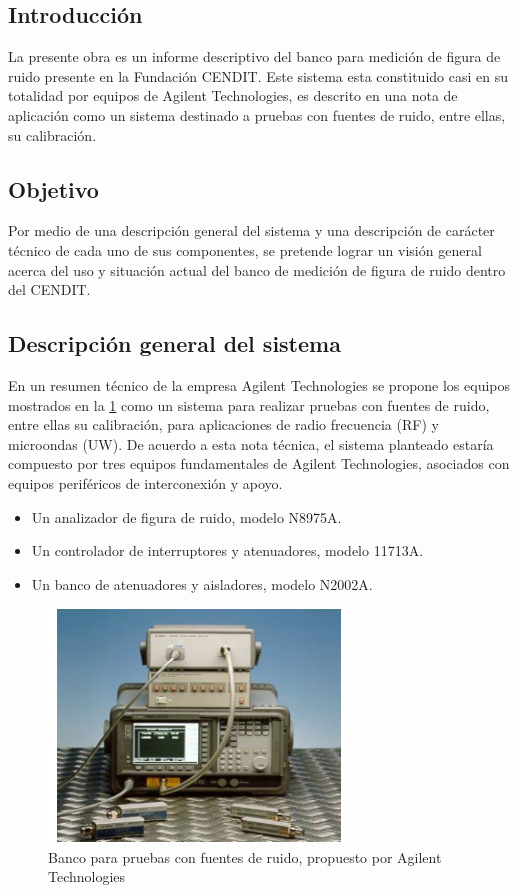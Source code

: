 	\subsection{Introducción}
	La presente obra es un informe descriptivo del banco para medición de figura de ruido presente en la Fundación CENDIT.
	Este sistema esta constituido casi en su totalidad por equipos de Agilent Technologies, es descrito en una nota de	aplicación como un sistema destinado a pruebas con fuentes de ruido, entre ellas, su calibración.
	
	\subsection{Objetivo}
	Por medio de una descripción general del sistema y una descripción de carácter técnico de cada uno de sus componentes, se pretende lograr un visión general acerca del uso y situación actual del banco de medición de figura de ruido dentro del CENDIT.
	
	\subsection{Descripción general del sistema}
	En un resumen técnico de la empresa Agilent Technologies \cite{AGI01} se propone los equipos mostrados en la \ref{Fig:BancoPruebasFuenteRuido} como un sistema para realizar pruebas con fuentes de ruido, entre ellas su calibración, para aplicaciones de radio frecuencia
	(RF) y microondas (UW). De acuerdo a esta nota técnica, el sistema planteado estaría compuesto por tres equipos
	fundamentales de Agilent Technologies, asociados con equipos periféricos de interconexión y apoyo.
	
	\begin{itemize}
		\item Un analizador de figura de ruido, modelo N8975A.
		\item Un controlador de interruptores y atenuadores, modelo 11713A.
		\item Un banco de atenuadores y aisladores, modelo N2002A.
	\end{itemize}	

	\begin{figure}[h!]			
		\centering
		\includegraphics[width=8cm]{Imagenes/EquiposSistemaMedicionRuido.pdf}
		\caption{Banco para pruebas con fuentes de ruido, propuesto por Agilent Technologies}
		\label{Fig:BancoPruebasFuenteRuido}
	\end{figure}

